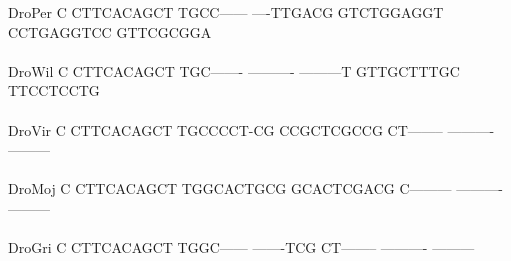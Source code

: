 \documentclass[11pt,twoside,reqno,a4paper]{article}
\begin{document}
{DroPer	C	CTTCACAGCT	TGCC------	----TTGACG	GTCTGGAGGT	CCTGAGGTCC	GTTCGCGGA\\
\hspace*{7\charwidth}\hspace*{1\charwidth}\hspace*{1\charwidth}\hspace*{1\charwidth}\hspace*{1\charwidth}\hspace*{1\charwidth}\hspace*{1\charwidth}\\
DroWil	C	CTTCACAGCT	TGC-------	----------	---------T	GTTGCTTTGC	TTCCTCCTG\\
\hspace*{7\charwidth}\hspace*{1\charwidth}\hspace*{1\charwidth}\hspace*{1\charwidth}\hspace*{1\charwidth}\hspace*{1\charwidth}\hspace*{1\charwidth}\\
DroVir	C	CTTCACAGCT	TGCCCCT-CG	CCGCTCGCCG	CT--------	----------	---------\\
\hspace*{7\charwidth}\hspace*{1\charwidth}\hspace*{1\charwidth}\hspace*{1\charwidth}\hspace*{1\charwidth}\hspace*{1\charwidth}\hspace*{1\charwidth}\\
DroMoj	C	CTTCACAGCT	TGGCACTGCG	GCACTCGACG	C---------	----------	---------\\
\hspace*{7\charwidth}\hspace*{1\charwidth}\hspace*{1\charwidth}\hspace*{1\charwidth}\hspace*{1\charwidth}\hspace*{1\charwidth}\hspace*{1\charwidth}\\
DroGri	C	CTTCACAGCT	TGGC------	-------TCG	CT--------	----------	---------\\
\hspace*{7\charwidth}\hspace*{1\charwidth}\hspace*{1\charwidth}\hspace*{1\charwidth}\hspace*{1\charwidth}\hspace*{1\charwidth}\hspace*{1\charwidth}\\
}
\end{document}
